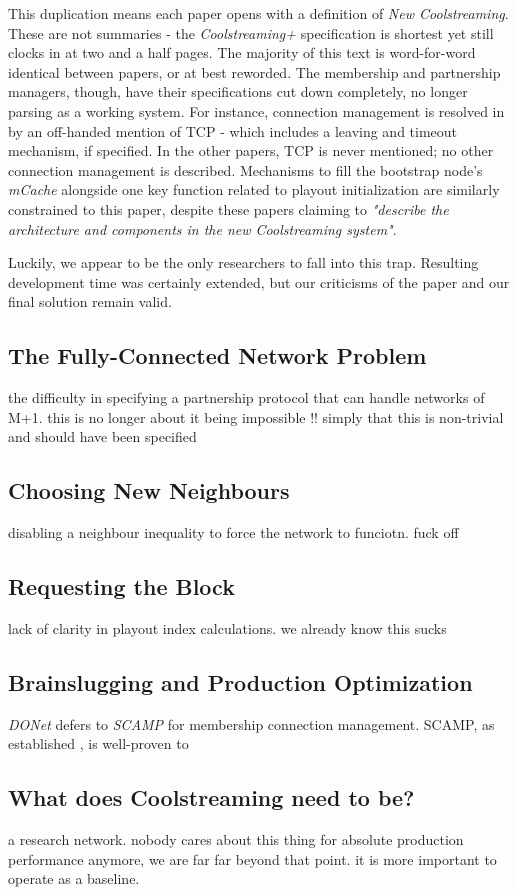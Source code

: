 \documentclass[12pt,a4paper]{article}
\begin{document}
This duplication means each paper opens with a definition of \textit{New Coolstreaming}. These are not summaries - the \textit{Coolstreaming+} specification is shortest yet still clocks in at two and a half pages. The majority of this text is word-for-word identical between papers, or at best reworded. The membership and partnership managers, though, have their specifications cut down completely, no longer parsing as a working system. For instance, connection management is resolved in \cite{Xie2007} by an off-handed mention of TCP - which includes a leaving and timeout mechanism, if specified. In the other papers, TCP is never mentioned; no other connection management is described. Mechanisms to fill the bootstrap node's \textit{mCache} alongside one key function related to playout initialization are similarly constrained to this paper, despite these papers claiming to \textit{"describe the architecture and components in the new Coolstreaming system"}.

Luckily, we appear to be the only researchers to fall into this trap. Resulting development time was certainly extended, but our criticisms of the paper and our final solution remain valid.

\subsection{The Fully-Connected Network Problem}
the difficulty in specifying a partnership protocol that can handle networks of M+1. this is no longer about it being impossible !! simply that this is non-trivial and should have been specified
\subsection{Choosing New Neighbours}
disabling a neighbour inequality to force the network to funciotn. fuck off
\subsection{Requesting the Block}
lack of clarity in playout index calculations. we already know this sucks
\subsection{Brainslugging and Production Optimization}
\textit{DONet} defers to \textit{SCAMP} for membership connection management. SCAMP, as established , is well-proven to 
\subsection{What does Coolstreaming need to be?}
a research network. nobody cares about this thing for absolute production performance anymore, we are far far beyond that point. it is more important to operate as a baseline.
\end{document}
